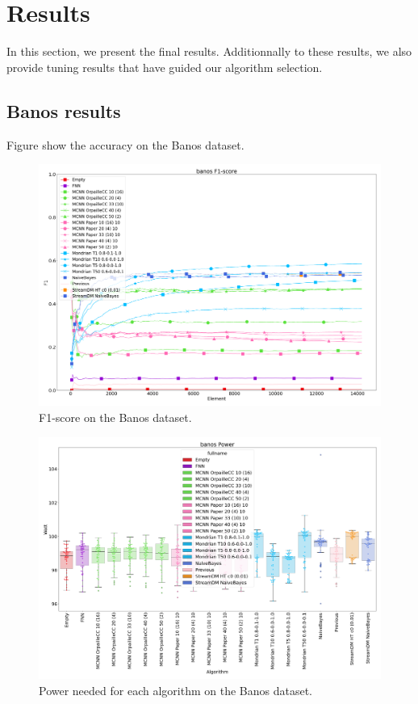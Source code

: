 \section{Results}
In this section, we present the final results. Additionnally to these results,
we also provide tuning results that have guided our algorithm selection.

\subsection{Banos results}
Figure show the accuracy on the Banos dataset.

\begin{figure}[H]
	\includegraphics[width=\linewidth]{figures/results/banos_f1.png}
	\caption{F1-score on the Banos dataset.}
\end{figure}
\begin{figure}[H]
	\includegraphics[width=\linewidth]{figures/results/banos_watt.png}
	\caption{Power needed for each algorithm on the Banos dataset.}
\end{figure}
